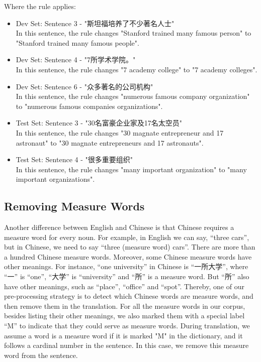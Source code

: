 \documentclass[11pt]{article} %
\begin{document}
\begin{CJK}{UTF8}{gbsn}
Where the rule applies:
\begin{itemize}
\item Dev Set: Sentence 3 - "斯坦福培养了不少著名人士"\\
In this sentence, the rule changes "Stanford trained many famous person" to "Stanford trained many famous people".
\item Dev Set: Sentence 4 - "7所学术学院。"\\
In this sentence, the rule changes "7  academy college" to "7 academy colleges".
\item Dev Set: Sentence 6 - "众多著名的公司机构"\\
In this sentence, the rule changes "numerous famous company organization" to "numerous famous companies organizations".
\item Test Set: Sentence 3 - "30名富豪企业家及17名太空员"\\
In this sentence, the rule changes "30  magnate entrepreneur and 17  astronaut" to "30 magnate entrepreneurs and 17 astronauts".
\item Test Set: Sentence 4 - "很多重要组织"\\
In this sentence, the rule changes "many important organization" to "many important organizations".
\end{itemize}

\subsection{Removing Measure Words}
Another difference between English and Chinese is that Chinese requires a measure word for every noun. For example, in English we can say, “three cars”, but in Chinese, we need to say “three (measure word) cars”. There are more than a hundred Chinese measure words. Moreover, some Chinese measure words have other meanings. For instance, “one university” in Chinese is “一所大学”, where “一” is “one”, “大学” is “university” and “所” is a measure word. But “所” also have other meanings, such as “place”, “office” and “spot”. Thereby, one of our pre-processing strategy is to detect which Chinese words are measure words, and then remove them in the translation. 
For all the measure words in our corpus, besides listing their other meanings, we also marked them with a special label “M” to indicate that they could serve as measure words. During translation, we assume a word is a measure word if it is marked "M" in the dictionary, and it follows a cardinal number in the sentence. In this case, we remove this measure word from the sentence.


\end{CJK}
\end{document}
